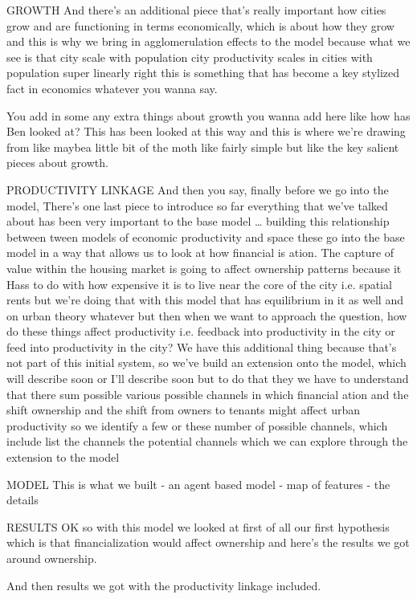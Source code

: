 \documentclass[]{article}
\begin{document}
GROWTH
And there’s an additional piece that’s really important how cities grow and are functioning in terms economically, which is about how they grow and this is why we bring in agglomerulation effects to the model because what we see is that city scale with population city productivity scales in cities with population super linearly right this is something that has become a key stylized fact in economics whatever you wanna say.

You add in some any extra things about growth you wanna add here like how has Ben looked at? This has been looked at this way and this is where we’re drawing from like maybea little bit of the moth like fairly simple but like the key salient pieces about growth.

PRODUCTIVITY LINKAGE
And then you say, finally before we go into the model, There’s one last piece to introduce so far everything that we’ve talked about has been very important to the base model …  building this relationship between tween models of economic productivity and space these go into the base model in a way that allows us to look at how financial is ation. The capture of value within the housing market is going to affect ownership patterns because it Hass to do with how expensive it is to live near the core of the city i.e. spatial rents but we’re doing that with this model that has equilibrium in it as well and on urban theory whatever but then when we want to approach the question, how do these things affect productivity i.e. feedback into productivity in the city or feed into productivity in the city? We have this additional thing because that’s not part of this initial system, so we’ve build an extension onto the model, which will describe soon or I’ll describe soon but to do that they we have to understand that there sum possible various possible channels in which financial ation and the shift ownership and the shift from owners to tenants might affect urban productivity so we identify a few or these number of possible channels, which include list the channels the potential channels which we can explore through the extension to the model



MODEL
This is what we built 
- an agent based model
- map of features
- the details

RESULTS
OK so with this model we looked at first of all our first hypothesis which is that financialization would affect ownership and here’s the results we got around ownership.

And then results we got with the productivity linkage included.
\end{document}
